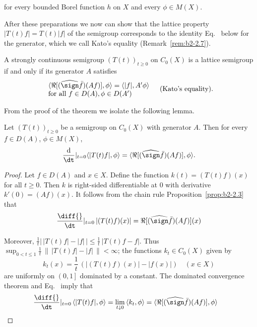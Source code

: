 for every bounded Borel function $h$ on $X$ and every $\phi \in M(X)$.

After these preparations we now can show that the lattice property $|T(t)f| = T(t)|f|$ of the semigroup corresponds to the identity Eq.~ below for the generator, which we call Kato's equality (\cf Remark~\ref{rem:b2-2.7}).
\begin{theorem}\label{thm:b2-2.5}
A strongly continuous semigroup $(T(t))_{t \geq 0}$ on $C_{0}(X)$ is a lattice semigroup if and only if its generator $A$ satisfies
\begin{equation}\label{eq:b2-2.9}
\begin{array}{l}
\langle \Re[(\widehat{\sign} \bar{f})(Af)],\phi \rangle = \langle |f|,A'\phi \rangle \\
\text{for all } f \in D(A), \phi \in D(A') 
\end{array} \quad \text{(Kato's equality)}.
\end{equation}
\end{theorem}
From the proof of the theorem we isolate the following lemma.
\begin{lemma}\label{lem:b2-2.6}
Let $(T(t))_{t \geq 0}$ be a semigroup on $C_{0}(X)$ with generator $A$.
Then for every $f \in D(A)$, $\phi \in M(X)$,
\begin{equation}\label{eq:b2-2.10}
\frac{\mathrm{d}}{\dt}
|_{t = 0} \langle |T(t)f|,\phi \rangle = \langle \Re[(\widehat{\sign} \bar{f})(Af)],\phi \rangle.
\end{equation}
\end{lemma}
\begin{proof}
Let $f \in D(A)$ and $x \in X$.
Define the function $k(t) = (T(t)f)(x)$ for all $t \geq 0$.
Then $k$ is right-sided differentiable at $0$ with derivative $k'(0) = (Af)(x)$.
It follows from the chain rule Proposition~\ref{prop:b2-2.3} that
\begin{equation}\label{eq:b2-2.11}
\frac{\diff{}}{\dt}
|_{t = 0}\, |(T(t)f)(x)| = \Re[(\widehat{\sign} \bar{f})(Af)](x)
\end{equation}

Moreover, $\frac{1}{t} \left|\, |T(t)f| - |f| \, \right| \leq \frac{1}{t}\, |T(t)f - f|$.
Thus $\sup_{0 < t \leq 1} \frac{1}{t}\, \|\, |T(t)f| - |f|\, \| < \infty$; \ie  the functions $k_{t} \in C_{0}(X)$ given by
\begin{equation}\label{eq:b2-2.12}
k_{t}(x) = \frac{1}{t}\,(|(T(t)f)(x)| - |f(x)|) \quad (x \in X)
\end{equation}
are uniformly on $\left(0,1\right]$ dominated by a constant.
The dominated convergence theorem and Eq.~ imply that
\begin{align*}
\frac{\diff{}}{\dt}|_{t=0}\, \langle |T(t)f|,\phi \rangle = \lim_{t \downarrow 0}\, \langle k_{t},\phi \rangle = \langle \Re[(\widehat{\sign} \bar{f})(Af)],\phi \rangle
&&\qedhere
\end{align*}
\end{proof}
